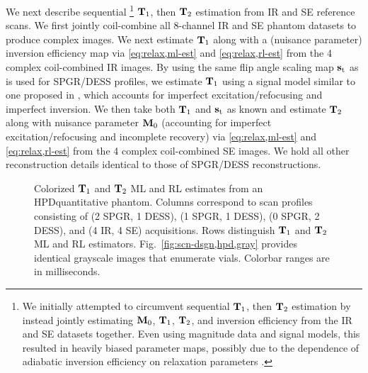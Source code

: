 We next describe sequential
\footnote{%
We initially attempted 
to circumvent sequential $\mathbf{T}_1$, then $\mathbf{T}_2$ estimation 
by instead jointly estimating $\mathbf{M}_0$, $\mathbf{T}_1$, $\mathbf{T}_2$, and inversion efficiency 
from the IR and SE datasets together.
Even using magnitude data and signal models, 
this resulted in heavily biased parameter maps, 
possibly due to the dependence 
of adiabatic inversion efficiency 
on relaxation parameters \cite{frank:97:spe}.
}
$\mathbf{T}_1$,
then $\mathbf{T}_2$ estimation
from IR and SE reference scans.
We first jointly coil-combine
all 8-channel IR and SE phantom datasets 
to produce complex images.
We next estimate $\mathbf{T}_1$ along 
with a (nuisance parameter) inversion efficiency map
via \eqref{eq:relax,ml-est} and \eqref{eq:relax,rl-est} 
from the 4 complex coil-combined IR images.
By using the same flip angle scaling map $\mathbf{s}_\mathrm{t}$ 
as is used for SPGR/DESS profiles, 
we estimate $\mathbf{T}_1$ using a signal model similar
to one proposed in \cite{barral:10:arm},
which accounts for imperfect excitation/refocusing 
and imperfect inversion.
We then take both $\mathbf{T}_1$ and $\mathbf{s}_\mathrm{t}$ 
as known and estimate $\mathbf{T}_2$ 
along with nuisance parameter $\mathbf{M}_0$ 
(accounting for imperfect excitation/refocusing and incomplete recovery) 
via \eqref{eq:relax,ml-est} and \eqref{eq:relax,rl-est} 
from the 4 complex coil-combined SE images.
We hold all other reconstruction details identical 
to those of SPGR/DESS reconstructions.

\begin{figure*} [!tb]
	\centering
	\vspace{0cm}
	\caption{
		Colorized $\mathbf{T}_1$ and $\mathbf{T}_2$ ML and RL estimates 
		from an HPD\regis quantitative phantom.
		Columns correspond to scan profiles consisting of 
		(2 SPGR, 1 DESS), (1 SPGR, 1 DESS), (0 SPGR, 2 DESS),
		and (4 IR, 4 SE) acquisitions. 
		Rows distinguish $\mathbf{T}_1$ and $\mathbf{T}_2$ ML and RL estimators. 
		Fig.~\ref{fig:scn-dsgn,hpd,gray} provides identical grayscale images
		that enumerate vials.
		Colorbar ranges are in milliseconds.
	}
	\label{fig:scn-dsgn,hpd,jet}
\end{figure*}

